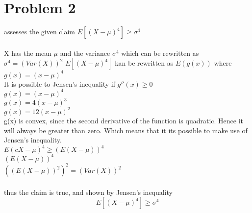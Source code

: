 \section{Problem 2}
assesses the given claim $E[(X-\mu)^{4}] \geq \sigma^{4}$
\\
\\
X has the mean $\mu$ and the variance $\sigma^{4}$ which can be rewritten as $\sigma^{4} = (Var(X))^2$
$E[(X-\mu)^{4}]$ kan be rewritten as $E(g(x))$ where $g(x) = (x - \mu)^{4}$
\\
It is possible to Jensen's inequality if $g''(x) \geq 0$\\
$g(x) = (x-\mu)^{4}$\\
$g(x) = 4(x-\mu)^{3}$\\
$g(x) = 12(x-\mu)^{2}$\\
g(x) is convex, since the second derivative of the function is quadratic. Hence it will always be
greater than zero. Which means that it its possible to make use of Jensen's inequality.
\\
$E(cX - \mu)^4 \geq (E(X - \mu))^4$\\
$(E(X - \mu))^4$\\
$((E(X - \mu))^2)^2 = (Var(X))^2$\\
\\
thus the claim is true, and shown by Jensen's inequality
$$E[(X-\mu)^{4}] \geq \sigma^{4}$$